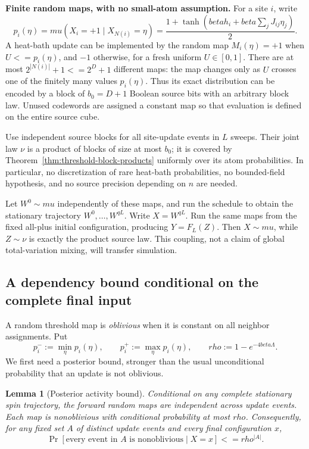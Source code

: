 \documentclass[11pt]{article}
\newtheorem{lemma}[theorem]{Lemma}
\theoremstyle{definition}
\theoremstyle{remark}
\def\beta{beta}\def\gamma{gamma}\def\lambda{lambda}%
\def\mu{mu}\def\rho{rho}\def\le{<=}\def\ge{>=}%
\begin{document}
\textbf{Finite random maps, with no small-atom assumption.}
For a site \(i\), write
\[
 p_i(\eta)=\mu(X_i=+1\mid X_{N(i)}=\eta)
 =\frac{1+\tanh(\beta h_i+\beta\sum_jJ_{ij}\eta_j)}2.
\]
A heat-bath update can be implemented by the random map
\(M_i(\eta)=+1\) when \(U\le p_i(\eta)\), and \(-1\) otherwise,
for a fresh uniform \(U\in[0,1]\). There are at most
\(2^{|N(i)|}+1\le2^D+1\) different maps: the map changes only as
\(U\) crosses one of the finitely many values \(p_i(\eta)\).
Thus its exact distribution can be encoded by a block of
\(b_0=D+1\) Boolean source bits with an arbitrary block law. Unused
codewords are assigned a constant map so that evaluation is defined on
the entire source cube.

Use independent source blocks for all site-update events in \(L\)
sweeps. Their joint law \(\nu\) is a product of blocks of size at most
\(b_0\); it is covered by Theorem~\ref{thm:threshold-block-products}
uniformly over its atom probabilities. In particular, no discretization
of rare heat-bath probabilities, no bounded-field hypothesis, and no
source precision depending on \(n\) are needed.

Let \(W^0\sim\mu\) independently of these maps, and run the schedule
to obtain the stationary trajectory \(W^0,\ldots,W^{qL}\). Write
\(X=W^{qL}\). Run the same maps from the fixed all-plus initial
configuration, producing \(Y=F_L(Z)\). Then \(X\sim\mu\), while
\(Z\sim\nu\) is exactly the product source law. This coupling,
not a claim of global total-variation mixing, will transfer simulation.

\subsection{A dependency bound conditional on the complete final input}
\label{resolution-dynamics:conditional-bound}

A random threshold map is \emph{oblivious} when it is constant on
all neighbor assignments. Put
\[
 p_i^-:=\min_\eta p_i(\eta),\qquad
 p_i^+:=\max_\eta p_i(\eta),\qquad
 \rho:=1-e^{-4\beta\Lambda}.
\]
We first need a posterior bound, stronger than the usual unconditional
probability that an update is not oblivious.

\begin{lemma}[Posterior activity bound]
\label{lem:resolution-dynamics-posterior-activity}
Conditional on any complete stationary spin trajectory, the forward
random maps are independent across update events. Each map is
nonoblivious with conditional probability at most \(\rho\).
Consequently, for any fixed set \(A\) of distinct update events and
every final configuration \(x\),
\[
 \Pr[\text{every event in }A\text{ is nonoblivious}\mid X=x]
 \le\rho^{|A|}.
 \tag{PA}
\]
\end{lemma}
\end{document}
